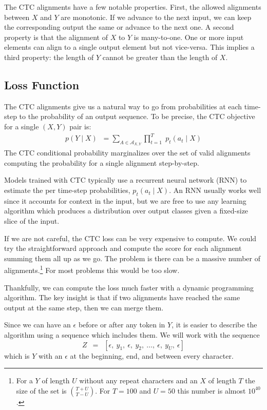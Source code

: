The CTC alignments have a few notable properties. First, the allowed alignments
between $X$ and $Y$ are monotonic.  If we advance to the next input, we can
keep the corresponding output the same or advance to the next one. A second
property is that the alignment of $X$ to $Y$ is many-to-one. One or more input
elements can align to a single output element but not vice-versa. This implies
a third property: the length of $Y$ cannot be greater than the length of $X$.

\subsection{Loss Function}

The CTC alignments give us a natural way to go from probabilities at each
time-step to the probability of an output sequence. To be precise, the CTC
objective for a single $(X, Y)$ pair is:
\begin{align*}
p(Y \mid X) \;\; = \sum_{A \in \mathcal{A}_{X,Y}}
      \prod_{t=1}^T \; p_t(a_t \mid X)
\end{align*}
The CTC conditional probability marginalizes over the set of valid alignments
computing the probability for a single alignment step-by-step.

Models trained with CTC typically use a recurrent neural network (RNN) to
estimate the per time-step probabilities, $p_t(a_t \mid X)$. An RNN usually
works well since it accounts for context in the input, but we are free to use
any learning algorithm which produces a distribution over output classes given
a fixed-size slice of the input.

If we are not careful, the CTC loss can be very expensive to compute. We could
try the straightforward approach and compute the score for each alignment
summing them all up as we go. The problem is there can be a massive number of
alignments.\footnote{For a $Y$ of length $U$ without any repeat characters and
an $X$ of length $T$ the size of the set is ${T + U \choose T - U}$. For
$T=100$ and $U=50$ this number is almost $10^{40}$.} For most problems this
would be too slow.

Thankfully, we can compute the loss much faster with a dynamic programming
algorithm. The key insight is that if two alignments have reached the same
output at the same step, then we can merge them.

Since we can have an $\epsilon$ before or after any token in $Y$, it is easier
to describe the algorithm using a sequence which includes them. We will work
with the sequence
\[
Z \enspace =\enspace [\epsilon, ~y_1, ~\epsilon, ~y_2,~ \ldots, ~\epsilon, ~y_U, ~\epsilon]
\]
which is $Y$ with an $\epsilon$ at the beginning, end, and between every
character.

